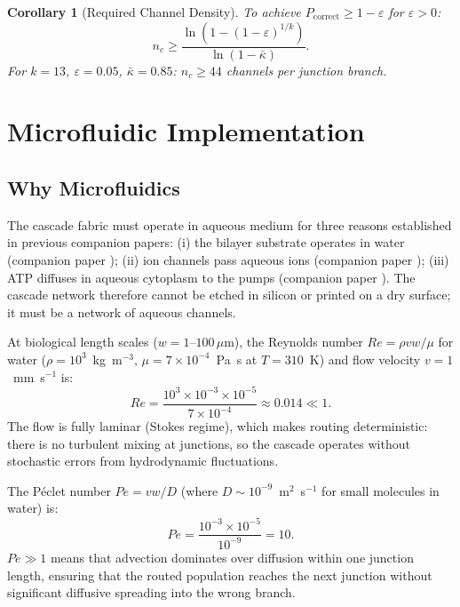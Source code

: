 \documentclass[11pt,twocolumn,a4paper]{article}
\newtheorem{corollary}[theorem]{Corollary}
\theoremstyle{remark}
\newcommand{\kap}{\kappa}
\begin{document}
\begin{corollary}[Required Channel Density]
\label{cor:chandensity}
To achieve $P_{\mathrm{correct}} \geq 1 - \varepsilon$ for $\varepsilon > 0$:
\begin{equation}
n_c \geq \frac{\ln(1 - (1-\varepsilon)^{1/k})}{\ln(1-\bar{\kap})}.
\label{eq:chandensity}
\end{equation}
For $k = 13$, $\varepsilon = 0.05$, $\bar{\kap} = 0.85$: $n_c \geq 44$ channels
per junction branch.
\end{corollary}

\section{Microfluidic Implementation}
\label{sec:microfluidic}

\subsection{Why Microfluidics}

The cascade fabric must operate in aqueous medium for three reasons established
in previous companion papers:
(i) the bilayer substrate operates in water (companion paper \citep{companion1});
(ii) ion channels pass aqueous ions (companion paper \citep{companion3});
(iii) ATP diffuses in aqueous cytoplasm to the pumps (companion paper \citep{companion4}).
The cascade network therefore cannot be etched in silicon or printed on a dry
surface; it must be a network of aqueous channels.

At biological length scales ($w = 1$--$100\,\mu$m), the Reynolds number
$Re = \rho v w / \mu$ for water ($\rho = 10^3$~kg~m$^{-3}$, $\mu = 7 \times
10^{-4}$~Pa~s at $T = 310$~K) and flow velocity $v = 1$~mm~s$^{-1}$ is:
\begin{equation}
Re = \frac{10^3 \times 10^{-3} \times 10^{-5}}{7\times10^{-4}} \approx 0.014 \ll 1.
\label{eq:reynolds}
\end{equation}
The flow is fully laminar (Stokes regime), which makes routing deterministic:
there is no turbulent mixing at junctions, so the cascade operates without
stochastic errors from hydrodynamic fluctuations.

The Péclet number $Pe = v w / D$ (where $D \sim 10^{-9}$~m$^2$~s$^{-1}$ for
small molecules in water) is:
\begin{equation}
Pe = \frac{10^{-3} \times 10^{-5}}{10^{-9}} = 10.
\label{eq:peclet}
\end{equation}
$Pe \gg 1$ means that advection dominates over diffusion within one junction
length, ensuring that the routed population reaches the next junction without
significant diffusive spreading into the wrong branch.
\end{document}
